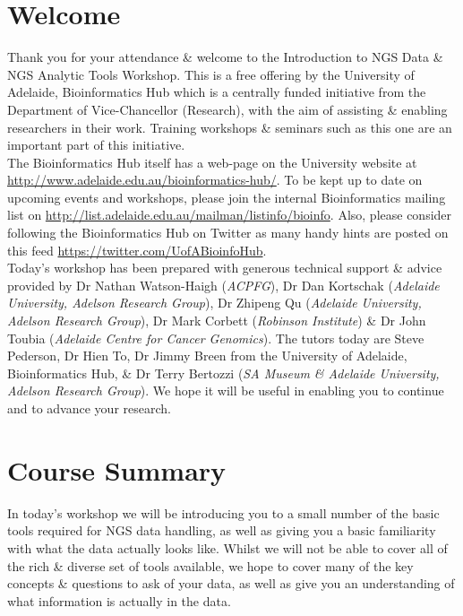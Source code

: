 %
%
\newpage
\section{Welcome}
Thank you for your attendance \& welcome to the Introduction to NGS Data \& NGS Analytic Tools Workshop.
This is a free offering by the University of Adelaide, Bioinformatics Hub which is a centrally funded initiative from the Department of Vice-Chancellor (Research), with the aim of assisting \& enabling researchers in their work.
Training workshops \& seminars such as this one  are an important part of this initiative. \\

The Bioinformatics Hub itself has a web-page on the University website at \url{http://www.adelaide.edu.au/bioinformatics-hub/}.
To be kept up to date on upcoming events and workshops, please join the internal Bioinformatics mailing list on \url{http://list.adelaide.edu.au/mailman/listinfo/bioinfo}.
Also, please consider following the Bioinformatics Hub on Twitter as many handy hints are posted on this feed \url{https://twitter.com/UofABioinfoHub}.\\

Today's workshop has been prepared with generous technical support \& advice provided by Dr Nathan Watson-Haigh (\textit{ACPFG}), Dr Dan Kortschak (\textit{Adelaide University, Adelson Research Group}), Dr Zhipeng Qu (\textit{Adelaide University, Adelson Research Group}), Dr Mark Corbett (\textit{Robinson Institute}) \& Dr John Toubia (\textit{Adelaide Centre for Cancer Genomics}). 
The tutors today are Steve Pederson, Dr Hien To, Dr Jimmy Breen from the University of Adelaide, Bioinformatics Hub, \& Dr Terry Bertozzi (\textit{SA Museum \& Adelaide University, Adelson Research Group}). 
We hope it will be useful in enabling you to continue and to advance your research.\\

\section{Course Summary}
In today's workshop we will be introducing you to a small number of the basic tools required for NGS data handling, as well as giving you a basic familiarity with what the data actually looks like.
Whilst we will not be able to cover all of the rich \& diverse set of tools available, we hope to cover many of the key concepts \& questions to ask of your data, as well as give you an understanding of what information is actually in the data.\\

